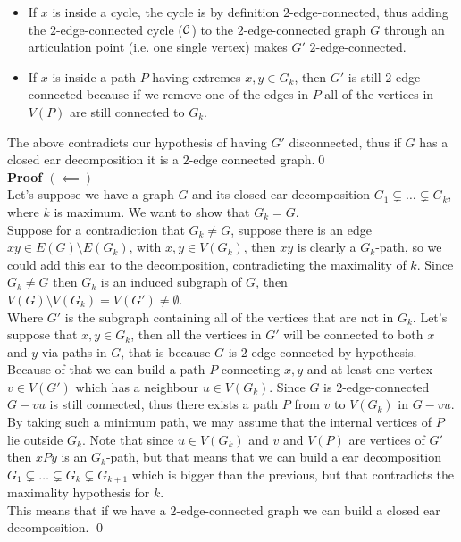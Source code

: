 \begin{itemize}
    \item If $x$ is inside a cycle, the cycle is by definition $2$-edge-connected, thus adding the $2$-edge-connected cycle ($\mathcal{C}$) to the $2$-edge-connected graph $G$ through an articulation point (i.e. one single vertex) makes $G'$ $2$-edge-connected.
    \item If $x$ is inside a path $P$ having extremes $x, y \in G_k$, then $G'$ is still $2$-edge-connected because if we remove one of the edges in $P$ all of the vertices in $V(P)$ are still connected to $G_k$.
\end{itemize}
The above contradicts our hypothesis of having $G'$ disconnected, thus if $G$ has a closed ear decomposition it is a $2$-edge connected graph.\qed\\
\linebreak
\boldmath
\textbf{Proof $(\impliedby)$}
\unboldmath\\
Let's suppose we have a graph $G$ and its closed ear decomposition $G_1 \subsetneq \dots \subsetneq G_k$, where $k$ is maximum. We want to show that $G_k = G$.\\
\linebreak
Suppose for a contradiction that $G_k \neq G$, suppose there is an edge $xy \in E(G) \setminus E(G_k)$, with $x, y \in V(G_k)$, then $xy$ is clearly a $G_k$-path, so we could add this ear to the decomposition, contradicting the maximality of $k$.
Since $G_k \neq G$ then $G_k$ is an induced subgraph of $G$, then $V(G) \setminus V(G_k) = V(G') \neq \emptyset$.\\
Where $G'$ is the subgraph containing all of the vertices that are not in $G_k$. Let's suppose that $x, y \in G_k$, then all the vertices in $G'$ will be connected to both $x$ and $y$ via paths in $G$, that is because $G$ is $2$-edge-connected by hypothesis.\\
\linebreak
Because of that we can build a path $P$ connecting $x, y$ and at least one vertex $v \in V(G')$ which has a neighbour $u \in V(G_k)$. Since $G$ is $2$-edge-connected $G - vu$ is still connected, thus there exists a path $P$ from $v$ to $V(G_k)$ in $G - vu$.
By taking such a minimum path, we may assume that the internal vertices of $P$ lie outside $G_k$. Note that since $u \in V(G_k)$ and $v$ and $V(P)$ are vertices of $G'$ then $xPy$ is an $G_k$-path, but that means that we can build a ear decomposition $G_1 \subsetneq \dots \subsetneq G_k \subsetneq G_{k + 1}$ which is bigger than the previous, but that contradicts the maximality hypothesis for $k$.\\
This means that if we have a $2$-edge-connected graph we can build a closed ear decomposition. \qed